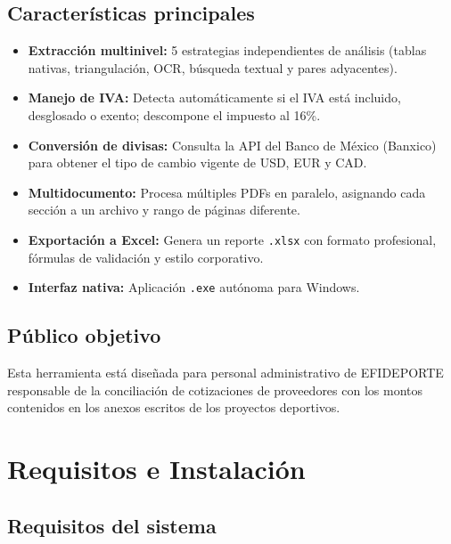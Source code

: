 \documentclass[12pt, a4paper, oneside]{report}
\begin{document}
\section{Características principales}

\begin{itemize}
  \item \textbf{Extracción multinivel:} 5 estrategias independientes de análisis
        (tablas nativas, triangulación, OCR, búsqueda textual y pares adyacentes).
  \item \textbf{Manejo de IVA:} Detecta automáticamente si el IVA está incluido,
        desglosado o exento; descompone el impuesto al 16\%.
  \item \textbf{Conversión de divisas:} Consulta la API del Banco de México (Banxico)
        para obtener el tipo de cambio vigente de USD, EUR y CAD.
  \item \textbf{Multidocumento:} Procesa múltiples PDFs en paralelo, asignando cada
        sección a un archivo y rango de páginas diferente.
  \item \textbf{Exportación a Excel:} Genera un reporte \texttt{.xlsx} con formato
        profesional, fórmulas de validación y estilo corporativo.
  \item \textbf{Interfaz nativa:} Aplicación \texttt{.exe} autónoma para Windows.
\end{itemize}

\section{Público objetivo}

Esta herramienta está diseñada para personal administrativo de EFIDEPORTE
responsable de la conciliación de cotizaciones de proveedores con los montos
contenidos en los anexos escritos de los proyectos deportivos.

\chapter{Requisitos e Instalación}

\section{Requisitos del sistema}
\end{document}
